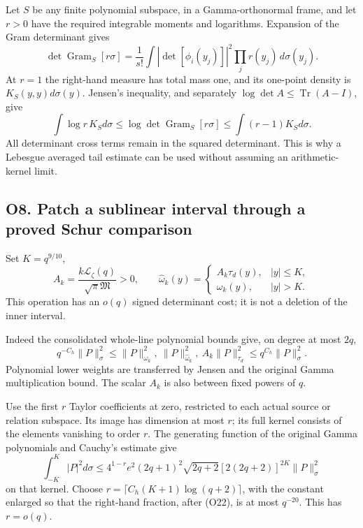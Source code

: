 \documentclass[
  11pt,
]{article}
\begin{document}
Let \(S\) be any finite polynomial subspace, in a Gamma-orthonormal
frame, and let \(r>0\) have the required integrable moments and
logarithms. Expansion of the Gram determinant gives \[
\det\operatorname{Gram}_S[r\sigma]
=\frac1{s!}\int |\det[\phi_i(y_j)]|^2\prod_jr(y_j)\,d\sigma(y_j).
\] At \(r=1\) the right-hand measure has total mass one, and its
one-point density is \(K_S(y,y)d\sigma(y)\). Jensen's inequality, and
separately \(\log\det A\le\operatorname{Tr}(A-I)\), give \[
\boxed{\int\log r\,K_Sd\sigma
\le\log\det\operatorname{Gram}_S[r\sigma]
\le\int(r-1)K_Sd\sigma.}\tag{O20}
\] All determinant cross terms remain in the squared determinant. This
is why a Lebesgue averaged tail estimate can be used without assuming an
arithmetic-kernel limit.

\subsection{O8. Patch a sublinear interval through a proved Schur
comparison}\label{o8.-patch-a-sublinear-interval-through-a-proved-schur-comparison}

Set \(K=q^{9/10}\), \[
A_k=\frac{k\mathcal L_\zeta(q)}{\sqrt\pi\mathfrak M}>0,
\qquad
\widehat\omega_k(y)=\begin{cases}A_k\tau_d(y),&|y|\le K,\\
\omega_k(y),&|y|>K.
\end{cases}\tag{O21}
\] This operation has an \(o(q)\) signed determinant cost; it is not a
deletion of the inner interval.

Indeed the consolidated whole-line polynomial bounds give, on degree at
most \(2q\), \[
q^{-C_h}\|P\|_\sigma^2\le
\|P\|_{\omega_k}^2,\ \|P\|_{\widehat\omega_k}^2,
\ A_k\|P\|_{\tau_d}^2
\le q^{C_h}\|P\|_\sigma^2.\tag{O22}
\] Polynomial lower weights are transferred by Jensen and the original
Gamma multiplication bound. The scalar \(A_k\) is also between fixed
powers of \(q\).

Use the first \(r\) Taylor coefficients at zero, restricted to each
actual source or relation subspace. Its image has dimension at most
\(r\); its full kernel consists of the elements vanishing to order
\(r\). The generating function of the original Gamma polynomials and
Cauchy's estimate give \[
\int_{-K}^{K}|P|^2d\sigma
\le4^{1-r}e^2(2q+1)^2\sqrt{2q+2}
[2(2q+2)]^{2K}\|P\|_\sigma^2
\tag{O23}
\] on that kernel. Choose \(r=\lceil C_h(K+1)\log(q+2)\rceil\), with the
constant enlarged so that the right-hand fraction, after (O22), is at
most \(q^{-20}\). This has \(r=o(q)\).
\end{document}
